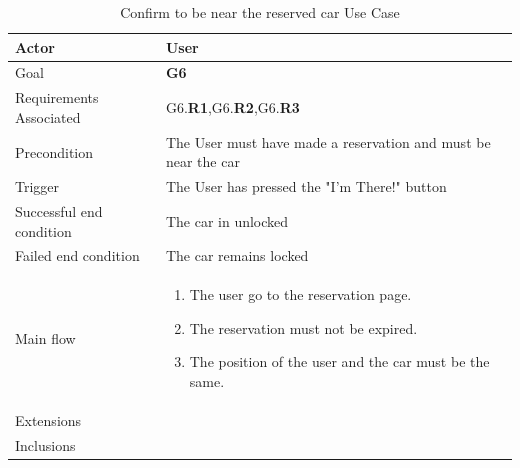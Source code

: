 \newline
\begin{table}[htb]
\begin{center}
\renewcommand{\arraystretch}{1.5}
\begin{tabular}{|l|p{}|}
\hline
Actor & User \\ \hline
Goal & \textbf{G6} \\ \hline
Requirements Associated & G6.\textbf{R1},G6.\textbf{R2},G6.\textbf{R3} \\ \hline
Precondition & The User must have made a reservation and must be near the car \\ \hline
Trigger & The User has pressed the "I'm There!" button \\ \hline
Successful end condition & The car in unlocked \\ \hline
Failed end condition & The car remains locked \\ \hline
Main flow & \begin{minipage}[t]{0.6\textwidth}
\begin{enumerate}
\addtolength{\itemindent}{0.5cm}
\item The user go to the reservation page.
\item The reservation must not be expired.
\item The position of the user and the car must be the same. 
\end{enumerate}
\end{minipage} \\ \hline
Extensions & \\ \hline
Inclusions & \\ \hline
\end{tabular}
\caption{ Confirm to be near the reserved car Use Case}
\end{center}
\end{table}
\clearpage

